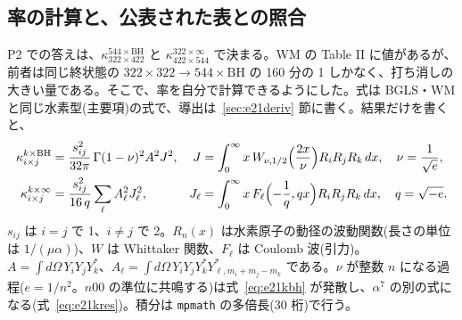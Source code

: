 \subsection{率の計算と、公表された表との照合}

P2 での答えは、$\kappa^{544\times\mathrm{BH}}_{322\times422}$ と $\kappa^{322\times\infty}_{422\times544}$ で決まる。WM の Table II に値があるが、前者は同じ終状態の $322\times322\to544\times\mathrm{BH}$ の 160 分の 1 しかなく、打ち消しの大きい量である。そこで、率を自分で計算できるようにした。式は BGLS・WM と同じ水素型(主要項)の式で、導出は~\ref{sec:e21deriv} 節に書く。結果だけを書くと、
\begin{align}
\kappa^{k\times\mathrm{BH}}_{i\times j}&=\frac{s_{ij}^2}{32\pi}\,\Gamma(1-\nu)^2A^2J^2,&
J&=\int_0^\infty x\,W_{\nu,1/2}\Bigl(\frac{2x}{\nu}\Bigr)R_iR_jR_k\,dx,\quad\nu=\frac{1}{\sqrt e},\label{eq:e21kbh}\\
\kappa^{k\times\infty}_{i\times j}&=\frac{s_{ij}^2}{16\,q}\sum_\ell A_\ell^2J_\ell^2,&
J_\ell&=\int_0^\infty x\,F_\ell\Bigl(-\frac1q,qx\Bigr)R_iR_jR_k\,dx,\quad q=\sqrt{-e}.\label{eq:e21kinf}
\end{align}
$s_{ij}$ は $i=j$ で 1、$i\ne j$ で 2。$R_n(x)$ は水素原子の動径の波動関数(長さの単位は $1/(\mu\alpha)$)、$W$ は Whittaker 関数、$F_\ell$ は Coulomb 波(引力)。$A=\int d\Omega\,Y_iY_jY_k^*$、$A_\ell=\int d\Omega\,Y_iY_jY_k^*Y^*_{\ell,m_i+m_j-m_k}$ である。$\nu$ が整数 $n$ になる過程($e=1/n^2$。$n00$ の準位に共鳴する)は式~\eqref{eq:e21kbh} が発散し、$\alpha^7$ の別の式になる(式~\eqref{eq:e21kres})。積分は \texttt{mpmath} の多倍長(30 桁)で行う。

